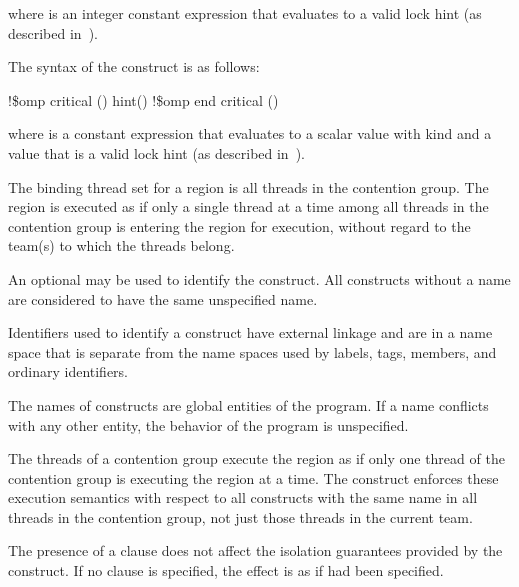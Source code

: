 {{{{where  is an integer constant expression that
evaluates to a valid lock hint (as described 
in~).
\ccppspecificend

\pagebreak

\fortranspecificstart
The syntax of the  construct is as follows:

\begin{boxedcode}
!\$omp critical \plc{[}() \plc{[}hint()\plc{] ]}
!\$omp end critical \plc{[}()\plc{]}  
\end{boxedcode}

where  is a constant expression that evaluates to
a scalar value with kind  and  a value
that is a valid lock hint (as described 
in~).
\fortranspecificend

\binding
The binding thread set for a  region is all threads in the contention group. 
The region is executed as if only a single thread at a time among all threads in the 
contention group is entering the region for execution, without regard to the team(s) to which the threads belong. 

\descr
An optional  may be used to identify the  construct. All  
constructs without a name are considered to have the same unspecified name. 

\ccppspecificstart
Identifiers used to identify a  construct have external linkage and are in a 
name space that is separate from the name spaces used by labels, tags, members, and 
ordinary identifiers.
\ccppspecificend

\fortranspecificstart
The names of  constructs are global entities of the program. If a name 
conflicts with any other entity, the behavior of the program is unspecified.
\fortranspecificend

The threads of a contention group execute the  region as if only one thread of the contention group is executing the  region at a time.
The  construct enforces these execution semantics with respect to all  constructs with the same name in all 
threads in the contention group, not just those threads in the current team.

The presence of a  clause does not affect the isolation
guarantees provided by the  construct. If no
 clause is specified, the effect is as if 
had been specified.

}}}}
